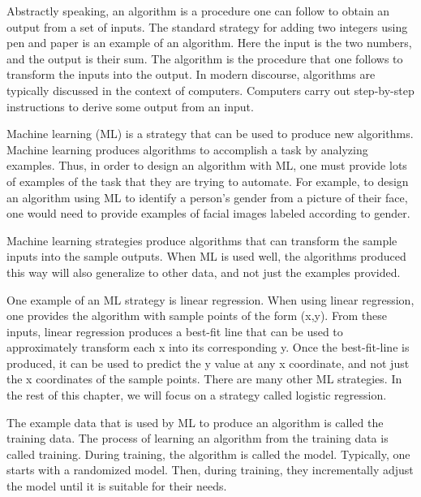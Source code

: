 \par Abstractly speaking, an algorithm is a procedure one can follow to obtain an output from a set of inputs. The standard strategy for adding two integers using pen and paper is an example of an algorithm. Here the input is the two numbers, and the output is their sum. The algorithm is the procedure that one follows to transform the inputs into the output. In modern discourse, algorithms are typically discussed in the context of computers. Computers carry out step-by-step instructions to derive some output from an input.
\par Machine learning (ML) is a strategy that can be used to produce new algorithms. Machine learning produces algorithms to accomplish a task by analyzing examples. Thus, in order to design an algorithm with ML, one must provide lots of examples of the task that they are trying to automate. For example, to design an algorithm using ML to identify a person’s gender from a picture of their face, one would need to provide examples of facial images labeled according to gender.
\par Machine learning strategies produce algorithms that can transform the sample inputs into the sample outputs. When ML is used well, the algorithms produced this way will also generalize to other data, and not just the examples provided.
\par One example of an ML strategy is linear regression. When using linear regression, one provides the algorithm with sample points of the form (x,y). From these inputs, linear regression produces a best-fit line that can be used to approximately transform each x into its corresponding y. Once the best-fit-line is produced, it can be used to predict the y value at any x coordinate, and not just the x coordinates of the sample points. There are many other ML strategies. In the rest of this chapter, we will focus on a strategy called logistic regression.
\par The example data that is used by ML to produce an algorithm is called the training data. The process of learning an algorithm from the training data is called training. During training, the algorithm is called the model. Typically, one starts with a randomized model. Then, during training, they incrementally adjust the model until it is suitable for their needs.


